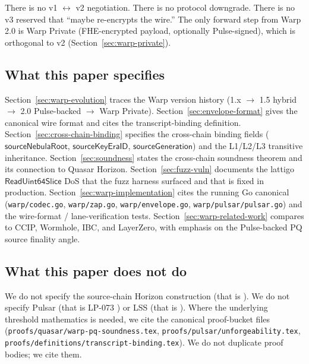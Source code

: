 There is no v1 $\leftrightarrow$ v2 negotiation. There is no protocol downgrade. There is no v3 reserved that ``maybe re-encrypts the wire.'' The only forward step from Warp 2.0 is Warp Private (FHE-encrypted payload, optionally Pulse-signed), which is orthogonal to v2 (Section~\ref{sec:warp-private}).

\subsection{What this paper specifies}

Section~\ref{sec:warp-evolution} traces the Warp version history (1.x $\to$ 1.5 hybrid $\to$ 2.0 Pulse-backed $\to$ Warp Private). Section~\ref{sec:envelope-format} gives the canonical wire format and cites the transcript-binding definition. Section~\ref{sec:cross-chain-binding} specifies the cross-chain binding fields ($\mathsf{sourceNebulaRoot}$, $\mathsf{sourceKeyEraID}$, $\mathsf{sourceGeneration}$) and the L1/L2/L3 transitive inheritance. Section~\ref{sec:soundness} states the cross-chain soundness theorem and its connection to Quasar Horizon. Section~\ref{sec:fuzz-vuln} documents the lattigo $\mathsf{ReadUint64Slice}$ DoS that the fuzz harness surfaced and that is fixed in production. Section~\ref{sec:warp-implementation} cites the running Go canonical (\texttt{warp/codec.go}, \texttt{warp/zap.go}, \texttt{warp/envelope.go}, \texttt{warp/pulsar/pulsar.go}) and the wire-format / lane-verification tests. Section~\ref{sec:warp-related-work} compares to CCIP, Wormhole, IBC, and LayerZero, with emphasis on the Pulse-backed PQ source finality angle.

\subsection{What this paper does not do}

We do not specify the source-chain Horizon construction (that is \cite{luxquasarhorizon}). We do not specify Pulsar (that is LP-073 \cite{lp073,luxpulsar}) or LSS (that is \cite{luxlssmpc,lp077}). Where the underlying threshold mathematics is needed, we cite the canonical proof-bucket files (\texttt{proofs/quasar/warp-pq-soundness.tex}, \texttt{proofs/pulsar/unforgeability.tex}, \texttt{proofs/definitions/transcript-binding.tex}). We do not duplicate proof bodies; we cite them.
